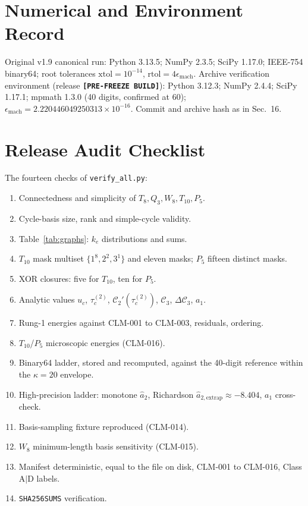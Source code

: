 \documentclass[10pt,twocolumn]{article}
\theoremstyle{definition}
\newcommand{\Tten}{T_{10}}
\newcommand{\Pfive}{P_5}
\newcommand{\tauc}{\tau_c^{(2)}}
\newcommand{\relName}{\textbf{[PRE-FREEZE BUILD]}}%
\begin{document}
\section{Numerical and Environment Record}
Original v1.9 canonical run: Python 3.13.5; NumPy 2.3.5; SciPy 1.17.0; IEEE-754 binary64; root tolerances $\mathrm{xtol}=10^{-14}$, $\mathrm{rtol}=4\epsilon_{\mathrm{mach}}$. Archive verification environment (release \texttt{\relName}): Python 3.12.3; NumPy 2.4.4; SciPy 1.17.1; mpmath 1.3.0 (40 digits, confirmed at 60); $\epsilon_{\mathrm{mach}}=2.220446049250313\times10^{-16}$. Commit and archive hash as in Sec.~16.

\section{Release Audit Checklist}
The fourteen checks of \texttt{verify\_all.py}:
\begin{enumerate}\setlength{\itemsep}{0pt}\footnotesize
\item Connectedness and simplicity of $T_8,Q_3,W_8,\Tten,\Pfive$.
\item Cycle-basis size, rank and simple-cycle validity.
\item Table~\ref{tab:graphs}: $k_e$ distributions and sums.
\item $\Tten$ mask multiset $\{1^8,2^2,3^1\}$ and eleven masks; $\Pfive$ fifteen distinct masks.
\item XOR closures: five for $\Tten$, ten for $\Pfive$.
\item Analytic values $u_c$, $\tauc$, $\mathcal C_2'(\tauc)$, $\mathcal C_3$, $\Delta\mathcal C_3$, $a_1$.
\item Rung-1 energies against CLM-001 to CLM-003, residuals, ordering.
\item $\Tten$/$\Pfive$ microscopic energies (CLM-016).
\item Binary64 ladder, stored and recomputed, against the 40-digit reference within the $\kappa=20$ envelope.
\item High-precision ladder: monotone $\hat a_2$, Richardson $\hat a_{2,\mathrm{extrap}}\approx-8.404$, $a_1$ cross-check.
\item Basis-sampling fixture reproduced (CLM-014).
\item $W_8$ minimum-length basis sensitivity (CLM-015).
\item Manifest deterministic, equal to the file on disk, CLM-001 to CLM-016, Class A$|$D labels.
\item \texttt{SHA256SUMS} verification.
\end{enumerate}
\end{document}
